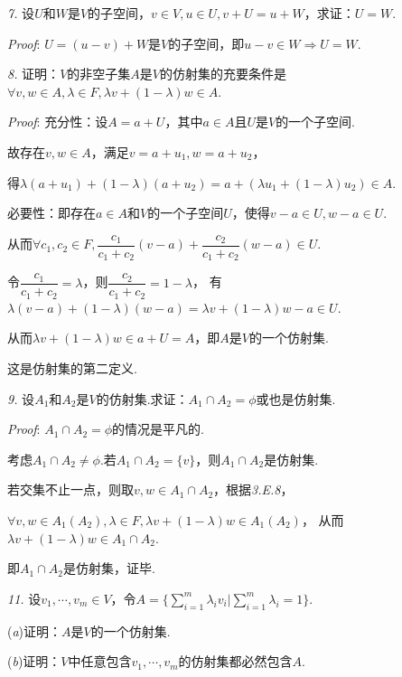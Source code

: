 \hspace*{\fill}

\textit{7.}
设$U$和$W$是$V$的子空间，$v \in V,u \in U,v+U=u+W$，求证：$U=W$.

\textit{Proof}:
$U=(u-v)+W$是$V$的子空间，即$u-v \in W \Rightarrow U=W$.

\hspace*{\fill}

\textit{8.}
证明：$V$的非空子集$A$是$V$的仿射集的充要条件是$\forall v,w \in A,\lambda \in F,\lambda v+(1- \lambda)w \in A$.

\textit{Proof}:
充分性：设$A=a+U$，其中$a\in A$且$U$是$V$的一个子空间.

故存在$v,w \in A$，满足$v=a+u_1,w=a+u_2$，

得$\lambda(a+u_1)+(1-\lambda)(a+u_2)=a+(\lambda u_1+(1-\lambda)u_2) \in A$.

必要性：即存在$a \in A$和$V$的一个子空间$U$，使得$v-a \in U,w-a \in U$.

从而$\forall c_1,c_2 \in F,\dfrac{c_1}{c_1+c_2}(v-a)+\dfrac{c_2}{c_1+c_2}(w-a) \in U$.

令$\dfrac{c_1}{c_1+c_2}=\lambda$，则$\dfrac{c_2}{c_1+c_2}=1-\lambda$，
有$\lambda (v-a)+(1- \lambda)(w-a)=\lambda v+(1- \lambda)w-a \in U$.

从而$\lambda v+(1- \lambda)w \in a+U=A$，即$A$是$V$的一个仿射集.

这是仿射集的第二定义.

\newpage

\textit{9.}
设$A_1$和$A_2$是$V$的仿射集.求证：$A_1 \cap A_2=\phi$或也是仿射集.

\textit{Proof}:
$A_1 \cap A_2=\phi$的情况是平凡的.

考虑$A_1 \cap A_2 \ne \phi$.若$A_1 \cap A_2=\{v\}$，则$A_1 \cap A_2$是仿射集.

若交集不止一点，则取$v,w \in A_1 \cap A_2$，根据\textit{3.E.8}，

$\forall v,w \in A_1(A_2),\lambda \in F,\lambda v+(1- \lambda)w \in A_1(A_2)$，
从而$\lambda v+(1- \lambda)w \in A_1 \cap A_2$.

即$A_1 \cap A_2$是仿射集，证毕.

\hspace*{\fill}

\textit{11.}
设$v_1,\cdots,v_m \in V$，令$A=\{\sum_{i=1}^m \lambda_i v_i|\sum_{i=1}^m \lambda_i=1\}$.

(\textit{a})证明：$A$是$V$的一个仿射集.

(\textit{b})证明：$V$中任意包含$v_1,\cdots,v_m$的仿射集都必然包含$A$.

